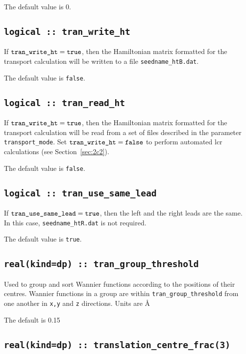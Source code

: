 The default value is 0.

\subsection[tran\_write\_ht]{\tt logical :: tran\_write\_ht}

If $\verb#tran_write_ht#=\verb#true#$, then the Hamiltonian matrix
formatted for the transport calculation will be written
to a file \verb#seedname_htB.dat#.

The default value is {\tt false}.

\subsection[tran\_read\_ht]{\tt logical :: tran\_read\_ht}

If $\verb#tran_write_ht#=\verb#true#$, then the Hamiltonian matrix
formatted for the transport calculation will be read
from a set of files described in the
parameter \verb#transport_mode#.
Set $\verb#tran_write_ht#=\verb#false#$ to perform automated
lcr calculations (see Section~\ref{sec:2c2}).

The default value is {\tt false}.

\subsection[tran\_use\_same\_lead]{\tt logical :: tran\_use\_same\_lead}

If $\verb#tran_use_same_lead#=\verb#true#$, then the
left and the right leads are the same. In this case,
\verb#seedname_htR.dat# is not required.

The default value is {\tt true}.

\subsection[tran\_group\_threshold]{\tt real(kind=dp) :: tran\_group\_threshold}

Used to group and sort Wannier functions according to the positions of their centres.
Wannier functions in a group are within \verb#tran_group_threshold#
from one another in \verb#x,y# and \verb#z# directions. Units are \AA

The default is 0.15

\subsection[translation\_centre\_frac]{\tt real(kind=dp) :: translation\_centre\_frac(3)}

